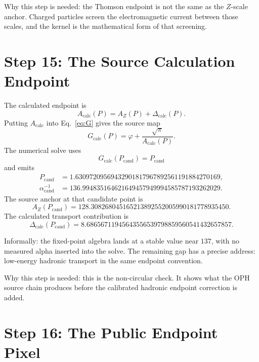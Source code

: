 \documentclass[11pt]{article}
\theoremstyle{remark}
\newcommand{\alphainv}{\alpha^{-1}}
\newcommand{\AZ}{A_Z}
\newcommand{\Dcalc}{\Delta_{\mathrm{calc}}}
\begin{document}
Why this step is needed: the Thomson endpoint is not the same as the \(Z\)-scale anchor. Charged particles screen the electromagnetic current between those scales, and the kernel is the mathematical form of that screening.

\section{Step 15: The Source Calculation Endpoint}

The calculated endpoint is
\begin{equation}
A_{\mathrm{calc}}(P)
=
\AZ(P)+\Dcalc(P).
\label{eq:Acalc}
\end{equation}
Putting \(A_{\mathrm{calc}}\) into Eq.~\eqref{eq:G} gives the source map
\begin{equation}
G_{\mathrm{calc}}(P)
=
\varphi+\frac{\sqrt\pi}{A_{\mathrm{calc}}(P)}.
\label{eq:Gcalc}
\end{equation}
The numerical solve uses
\begin{equation}
G_{\mathrm{calc}}(P_{\mathrm{cand}})=P_{\mathrm{cand}}
\label{eq:Pcand}
\end{equation}
and emits
\begin{align}
P_{\mathrm{cand}}
&=
1.63097209569432901817967892561191884270169,
\label{eq:Pcandnum}\\
\alphainv_{\mathrm{cand}}
&=
136.994835164621649457949994585787193262029.
\label{eq:alphacand}
\end{align}
The source anchor at that candidate point is
\begin{equation}
\AZ(P_{\mathrm{cand}})
=
128.308268045165213892552005990181778935450.
\label{eq:AZcand}
\end{equation}
The calculated transport contribution is
\begin{equation}
\Dcalc(P_{\mathrm{cand}})
=
8.68656711945643556539798859560541432657857.
\label{eq:Dcalccand}
\end{equation}

Informally: the fixed-point algebra lands at a stable value near \(137\), with no measured alpha inserted into the solve. The remaining gap has a precise address: low-energy hadronic transport in the same endpoint convention.

Why this step is needed: this is the non-circular check. It shows what the OPH source chain produces before the calibrated hadronic endpoint correction is added.

\section{Step 16: The Public Endpoint Pixel}
\end{document}
